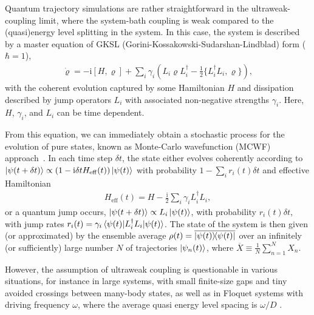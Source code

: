\documentclass[twocolumn,prl,superscriptaddress]{revtex4-2}
\renewcommand{\i}{\mathrm i}
\begin{document}
Quantum trajectory simulations are rather straightforward in the ultraweak-coupling limit, where the system-bath coupling is weak compared to the (quasi)energy level splitting in the system. In this case, the system is described by a master equation of GKSL (Gorini-Kossakowski-Sudarshan-Lindblad) form \cite{GoriniKossakowski1976,GLindblad1976} ($\hbar=1$),  
\begin{align}
	\dot \varrho = -\i[H, \varrho] + \sum\limits_{i} \gamma_i \left( L_i \varrho L_i^\dagger - \frac{1}{2} \{ L_i^\dagger L_i,\varrho \} \right) ,
	\label{eq:pseudo_lindblad}
\end{align}
with the coherent evolution captured by some Hamiltonian $H$ and dissipation described by jump operators $L_i$ with associated non-negative strengths $\gamma_i$. Here, $H$, $\gamma_i$, and $L_i$ can be time dependent. 

From this equation, we can immediately obtain a stochastic process for the evolution of pure states, known as Monte-Carlo wavefunction (MCWF) approach~\cite{Dalibard92,Kmolmer1993,GardinerZoller1992:1,GardinerZoller1992:2,NGisin1992:1,NGisin1992:2,HCarmicheal1999,ADaley2014}. In each time step $\delta t$, the state either evolves coherently according to  $\ket{\psi(t+\delta t)} \propto (1-\i \delta t H_\mathrm{eff}(t))\ket{\psi(t)}$  with probability $1- \sum_i r_i(t) \delta t$ and effective Hamiltonian 
\begin{align} 
	H_\mathrm{eff}(t) = H - \frac{\i}{2} \sum_i \gamma_i L_i^\dagger L_i,
	\label{eq:eff_Hamiltonian}
\end{align}
or a quantum jump occurs, $\ket{\psi(t+\delta t)} \propto L_i \ket{\psi(t)}$, with probability $r_i(t) \delta t$, with jump rates $r_i(t) = \gamma_i \matrixel{\psi(t)}{L_i^\dag L_i }{\psi(t)}$. The state of the system is then given (or approximated) by the ensemble average $\rho(t)= \overline{\dyad{\psi(t)}}$ over an infinitely (or sufficiently) large number $N$ of trajectories $\ket{\psi_n(t)}$, where $\overline{X} \equiv\frac{1}{N}\sum_{n=1}^N X_n$. 

However, the assumption of ultraweak coupling is questionable in various situations, for instance in large systems, with small finite-size gaps and tiny avoided crossings between many-body states, as well as in Floquet systems with driving frequency $\omega$, where the average quasi energy level spacing is $\omega/D$ \cite{eckardtColloquiumAtomicQuantum2017}. 
\end{document}
